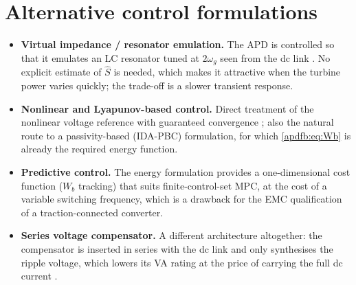 \section{Alternative control formulations}

\begin{itemize}
\item \textbf{Virtual impedance / resonator emulation.} The APD is controlled so
that it emulates an LC resonator tuned at $2\omega_g$ seen from the dc link
\cite{liu2021lcresonator}. No explicit estimate of $\hat S$ is needed, which
makes it attractive when the turbine power varies quickly; the trade-off is a
slower transient response.

\item \textbf{Nonlinear and Lyapunov-based control.} Direct treatment of the
nonlinear voltage reference with guaranteed convergence
\cite{yuan2019nonlinear,liu2024lyapunov}; also the natural route to a
passivity-based (IDA-PBC) formulation, for which \eqref{apdfb:eq:Wb} is already the
required energy function.

\item \textbf{Predictive control.} The energy formulation provides a
one-dimensional cost function ($W_b$ tracking) that suits finite-control-set
MPC, at the cost of a variable switching frequency, which is a drawback for the
EMC qualification of a traction-connected converter.

\item \textbf{Series voltage compensator.} A different architecture altogether:
the compensator is inserted in series with the dc link and only synthesises the
ripple voltage, which lowers its VA rating at the price of carrying the full dc
current \cite{wang2014series}.
\end{itemize}

